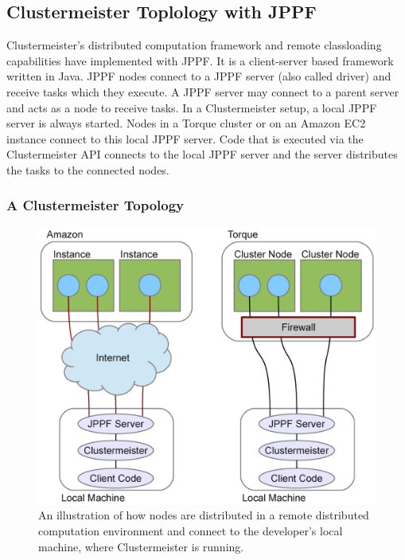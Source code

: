 \documentclass[english]{uzhpub}
\begin{document}
\subsection{Clustermeister Toplology with JPPF}
\label{topology}
Clustermeister's distributed computation framework and remote classloading capabilities have implemented with JPPF. It is a client-server based framework written in Java. JPPF nodes connect to a JPPF server (also called driver) and receive tasks which they execute. A JPPF server may connect to a parent server and acts as a node to receive tasks. In a Clustermeister setup, a local JPPF server is always started. Nodes in a Torque cluster or on an Amazon EC2 instance connect to this local JPPF server. Code that is executed via the Clustermeister API connects to the local JPPF server and the server distributes the tasks to the connected nodes.

\subsubsection{A Clustermeister Topology}
\begin{figure}[h]
\centering
\includegraphics[scale=0.5]{images/topology.pdf}
\caption{An illustration of how nodes are distributed in a remote distributed computation environment and connect to the developer's local machine, where Clustermeister is running.}
\label{fig:topology}
\end{figure}
\end{document}
